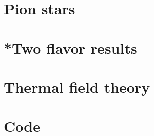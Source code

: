 \documentclass{book}
\begin{document}
    \chapter{Pion stars}
    \label{chapter: pion stars}
    

    \appendix

    \chapter[Appendix A]{}
    
    
    

    \chapter{*Two flavor results}
    
    
    
    

    \chapter{Thermal field theory}
    \label{appendix: thermal field theory}
    
    
    
    
    
    
    
    \chapter{Code}
    

    \cleardoublepage
    \printbibliography
\end{document}
